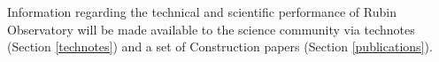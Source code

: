 \documentclass[SE,authoryear,toc,lsstdraft]{lsstdoc}
\begin{document}
Information regarding the technical and scientific performance of Rubin Observatory will be made available to the science community via technotes (Section \ref{technotes}) and a set of Construction papers (Section \ref{publications}).

\end{document}
